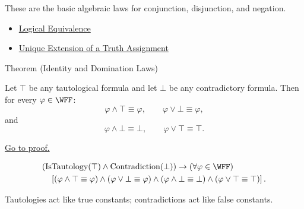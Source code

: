 \begin{remark*}[Interpretation]
These are the basic algebraic laws for conjunction, disjunction, and negation.
\end{remark*}

\begin{dependencies}
\begin{itemize}
  \item \hyperref[def:logical-equivalence-propositional-logic]{Logical Equivalence}
  \item \hyperref[thm:unique-extension-truth-assignment-propositional-logic]{Unique Extension of a Truth Assignment}
\end{itemize}
\end{dependencies}
\begin{theorembox}{Theorem (Identity and Domination Laws)}
\begin{theorem}
\label{thm:identity-domination-laws-propositional-logic}
Let \(\top\) be any tautological formula and let \(\bot\) be any contradictory formula. Then for every \(\varphi\in\WFF\):
\[
\varphi\land\top\equiv\varphi,
\qquad
\varphi\lor\bot\equiv\varphi,
\]
and
\[
\varphi\land\bot\equiv\bot,
\qquad
\varphi\lor\top\equiv\top.
\]

\noindent\hyperref[prf:identity-domination-laws-propositional-logic]{Go to proof.}
\end{theorem}
\end{theorembox}

\begin{remark*}
\[
\begin{aligned}
&(\operatorname{IsTautology}(\top)\land \operatorname{Contradiction}(\bot))
\to
(\forall\varphi\in\WFF)\\
&\quad
\left[
(\varphi\land\top\equiv\varphi)
\land
(\varphi\lor\bot\equiv\varphi)
\land
(\varphi\land\bot\equiv\bot)
\land
(\varphi\lor\top\equiv\top)
\right].
\end{aligned}
\]
\end{remark*}

\begin{remark*}[Interpretation]
Tautologies act like true constants; contradictions act like false constants.
\end{remark*}

